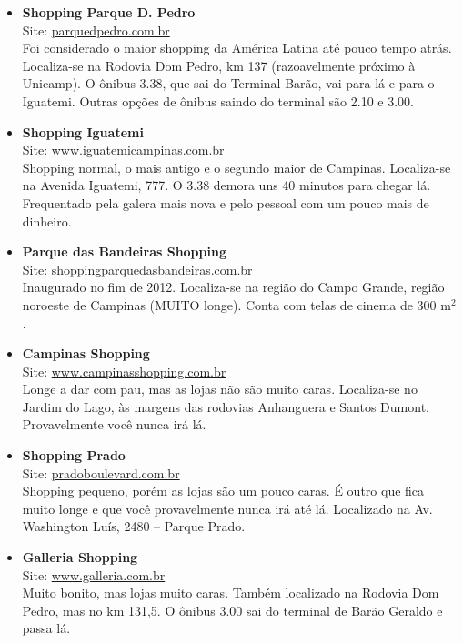 \begin{itemize}
\item \textbf{Shopping Parque D. Pedro}
  \\Site: \url{parquedpedro.com.br}
  \\Foi considerado o maior shopping da América Latina até pouco tempo atrás.
  Localiza-se na Rodovia Dom Pedro, km 137 (razoavelmente próximo à Unicamp).
  O ônibus 3.38, que sai do Terminal Barão, vai para lá e para o Iguatemi.
  Outras opções de ônibus saindo do terminal são 2.10 e 3.00.

\item \textbf{Shopping Iguatemi}
  \\Site: \url{www.iguatemicampinas.com.br}
  \\Shopping normal, o mais antigo e o segundo maior de Campinas. Localiza-se
  na Avenida Iguatemi, 777. O 3.38 demora uns 40 minutos para chegar lá.
  Frequentado pela galera mais nova e pelo pessoal com um pouco mais de
  dinheiro.

\item \textbf{Parque das Bandeiras Shopping}
  \\Site: \url{shoppingparquedasbandeiras.com.br}
  \\Inaugurado no fim de 2012. Localiza-se na região do Campo Grande, região
  noroeste de Campinas (MUITO longe). Conta com telas de cinema de 300 m$^{2}$.

\item \textbf{Campinas Shopping}
  \\Site: \url{www.campinasshopping.com.br}
  \\Longe a dar com pau, mas as lojas não são muito caras. Localiza-se no
  Jardim do Lago, às margens das rodovias Anhanguera e Santos Dumont.
  Provavelmente você nunca irá lá.

\item \textbf{Shopping Prado}
  \\Site: \url{pradoboulevard.com.br}
  \\Shopping pequeno, porém as lojas são um pouco caras. É outro que fica muito
  longe e que você provavelmente nunca irá até lá. Localizado na Av. Washington
  Luís, 2480 -- Parque Prado.

\item \textbf{Galleria Shopping}
  \\Site: \url{www.galleria.com.br}
  \\Muito bonito, mas lojas muito caras. Também localizado na Rodovia Dom
  Pedro, mas no km 131,5. O ônibus 3.00 sai do terminal de Barão Geraldo e
  passa lá.


\end{itemize}
